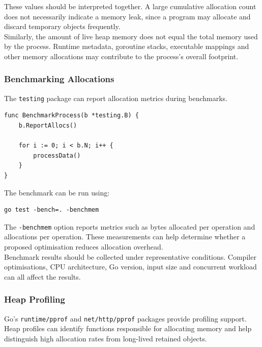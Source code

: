 These values should be interpreted together. A large cumulative allocation count does not necessarily indicate a memory leak, since a program may allocate and discard temporary objects frequently.\\

Similarly, the amount of live heap memory does not equal the total memory used by the process. Runtime metadata, goroutine stacks, executable mappings and other memory allocations may contribute to the process's overall footprint.

\subsubsection{Benchmarking Allocations}

The \texttt{testing} package can report allocation metrics during benchmarks.

\begin{lstlisting}
func BenchmarkProcess(b *testing.B) {
    b.ReportAllocs()

    for i := 0; i < b.N; i++ {
        processData()
    }
}
\end{lstlisting}

The benchmark can be run using:

\begin{lstlisting}
go test -bench=. -benchmem
\end{lstlisting}

The \texttt{-benchmem} option reports metrics such as bytes allocated per operation and allocations per operation. These measurements can help determine whether a proposed optimisation reduces allocation overhead.\\

Benchmark results should be collected under representative conditions. Compiler optimisations, CPU architecture, Go version, input size and concurrent workload can all affect the results.\\

\subsubsection{Heap Profiling}

Go's \texttt{runtime/pprof} and \texttt{net/http/pprof} packages provide profiling support. Heap profiles can identify functions responsible for allocating memory and help distinguish high allocation rates from long-lived retained objects.\\

